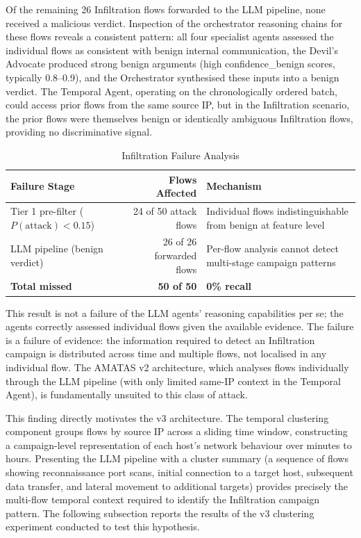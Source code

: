 Of the remaining 26 Infiltration flows forwarded to the LLM pipeline, none received a malicious verdict. Inspection of the orchestrator reasoning chains for these flows reveals a consistent pattern: all four specialist agents assessed the individual flows as consistent with benign internal communication, the Devil's Advocate produced strong benign arguments (high confidence\_benign scores, typically 0.8--0.9), and the Orchestrator synthesised these inputs into a benign verdict. The Temporal Agent, operating on the chronologically ordered batch, could access prior flows from the same source IP, but in the Infiltration scenario, the prior flows were themselves benign or identically ambiguous Infiltration flows, providing no discriminative signal.

\begin{table}[H]
\centering
\caption{Infiltration Failure Analysis}
\label{tab:infiltration-failure}
\begin{tabularx}{\textwidth}{l r X}
\toprule
Failure Stage & Flows Affected & Mechanism \\
\midrule
Tier 1 pre-filter ($P(\text{attack}) < 0.15$) & 24 of 50 attack flows & Individual flows indistinguishable from benign at feature level \\
LLM pipeline (benign verdict) & 26 of 26 forwarded flows & Per-flow analysis cannot detect multi-stage campaign patterns \\
\midrule
\textbf{Total missed} & \textbf{50 of 50} & \textbf{0\% recall} \\
\bottomrule
\end{tabularx}
\end{table}

This result is not a failure of the LLM agents' reasoning capabilities per se; the agents correctly assessed individual flows given the available evidence. The failure is a failure of evidence: the information required to detect an Infiltration campaign is distributed across time and multiple flows, not localised in any individual flow. The AMATAS v2 architecture, which analyses flows individually through the LLM pipeline (with only limited same-IP context in the Temporal Agent), is fundamentally unsuited to this class of attack.

This finding directly motivates the v3 architecture. The temporal clustering component groups flows by source IP across a sliding time window, constructing a campaign-level representation of each host's network behaviour over minutes to hours. Presenting the LLM pipeline with a cluster summary (a sequence of flows showing reconnaissance port scans, initial connection to a target host, subsequent data transfer, and lateral movement to additional targets) provides precisely the multi-flow temporal context required to identify the Infiltration campaign pattern. The following subsection reports the results of the v3 clustering experiment conducted to test this hypothesis.

